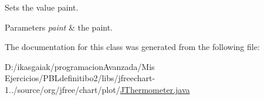 Sets the value paint.


\begin{DoxyParams}{Parameters}
{\em paint} & the paint. \\
\hline
\end{DoxyParams}


The documentation for this class was generated from the following file\+:\begin{DoxyCompactItemize}
\item 
D\+:/ikasgaiak/programacion\+Avanzada/\+Mis Ejercicios/\+P\+B\+Ldefinitibo2/libs/jfreechart-\/1../source/org/jfree/chart/plot/\mbox{\hyperlink{_j_thermometer_8java}{J\+Thermometer.\+java}}\end{DoxyCompactItemize}

